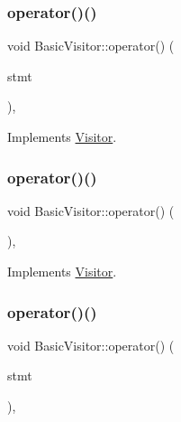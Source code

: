 \subsubsection{\texorpdfstring{operator()()}{operator()()}\hspace{0.1cm}{\footnotesize\ttfamily [24/59]}}
{\footnotesize\ttfamily void Basic\+Visitor\+::operator() (\begin{DoxyParamCaption}\item[{const \hyperlink{struct_variable_statement}{Variable\+Statement} \&}]{stmt }\end{DoxyParamCaption})\hspace{0.3cm}{\ttfamily [inline]}, {\ttfamily [virtual]}}



Implements \hyperlink{struct_visitor_accbed2e228126d93b162df7bb44bb3c8}{Visitor}.

\mbox{\label{struct_basic_visitor_a210214f50f892e5bdf5b5903b2191ab6}} 
\subsubsection{\texorpdfstring{operator()()}{operator()()}\hspace{0.1cm}{\footnotesize\ttfamily [25/59]}}
{\footnotesize\ttfamily void Basic\+Visitor\+::operator() (\begin{DoxyParamCaption}\item[{const \hyperlink{struct_empty_statement}{Empty\+Statement} \&}]{ }\end{DoxyParamCaption})\hspace{0.3cm}{\ttfamily [inline]}, {\ttfamily [virtual]}}



Implements \hyperlink{struct_visitor_a67719a8d9005a86141e4cb9226c11ca4}{Visitor}.

\mbox{\label{struct_basic_visitor_ae944edc097bb1bcbd5625fbc81c78d0a}} 
\subsubsection{\texorpdfstring{operator()()}{operator()()}\hspace{0.1cm}{\footnotesize\ttfamily [26/59]}}
{\footnotesize\ttfamily void Basic\+Visitor\+::operator() (\begin{DoxyParamCaption}\item[{const \hyperlink{struct_expression_statement}{Expression\+Statement} \&}]{stmt }\end{DoxyParamCaption})\hspace{0.3cm}{\ttfamily [inline]}, {\ttfamily [virtual]}}



